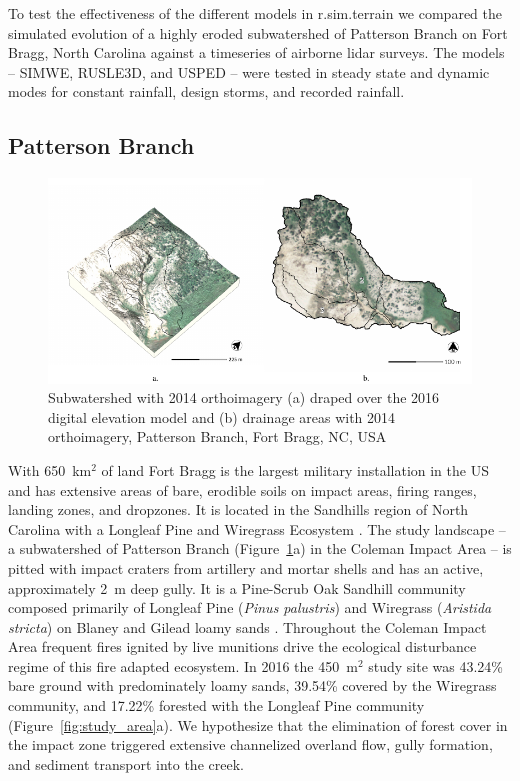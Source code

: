 \documentclass[gmd, manuscript]{copernicus}
\begin{document}
To test the effectiveness of the different models 
in r.sim.terrain
we compared the simulated evolution
of a highly eroded subwatershed of 
Patterson Branch on Fort Bragg, North Carolina
against a timeseries of airborne lidar surveys.
The models -- SIMWE, RUSLE3D, and USPED --
were tested in steady state and dynamic modes
for constant rainfall, design storms, and recorded rainfall.

\subsection{Patterson Branch}

\begin{figure}
\center
\includegraphics[width=\textwidth,height=0.95\textheight,keepaspectratio]{figures/watershed.pdf}
\caption{Subwatershed with 2014 orthoimagery
(a) draped over the 2016 digital elevation model
and (b) drainage areas with 2014 orthoimagery, Patterson Branch, Fort Bragg, NC, USA}
\label{fig:watershed}
\end{figure}

With 650~\unit{km}$^{2}$ of land
Fort Bragg is the largest military installation in the US
and has extensive areas of bare, erodible soils
on impact areas, firing ranges, landing zones, and dropzones. 
It is located in the Sandhills region of North Carolina 
with a Longleaf Pine and Wiregrass Ecosystem \citep{Sorrie2006}.
%
The study landscape 
-- a subwatershed of Patterson Branch (Figure~\ref{fig:watershed}a) 
in the Coleman Impact Area --
is pitted with impact craters from artillery and mortar shells
and has an active, approximately 2~\unit{m} deep gully. 
%
It is a Pine-Scrub Oak Sandhill community
composed primarily of Longleaf Pine (\emph{Pinus palustris})
and Wiregrass (\emph{Aristida stricta})
on Blaney and Gilead loamy sands 
\citep{Sorrie2004}. 
%
Throughout the Coleman Impact Area
frequent fires ignited by live munitions
drive the ecological disturbance regime
of this fire adapted ecosystem.
%
In 2016 the  450~\unit{m}$^{2}$ study site was
43.24\% bare ground with predominately loamy sands,
39.54\% covered by the Wiregrass community, and
17.22\% forested with the Longleaf Pine community 
(Figure~\ref{fig:study_area}a). 
%
We hypothesize that the elimination of forest cover
in the impact zone
triggered extensive channelized overland flow,
gully formation, and sediment transport into the creek. 
\end{document}
